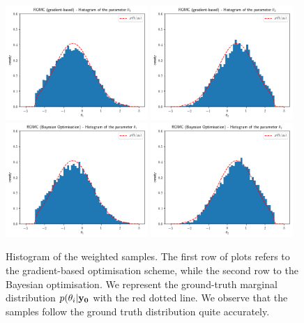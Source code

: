 \begin{figure}[h]
    \begin{center}
      \includegraphics[width=0.48\textwidth]{./Thesis/images/chapter4/ex2D_hist_t1_romc.png}
      \includegraphics[width=0.48\textwidth]{./Thesis/images/chapter4/ex2D_hist_t2_romc.png}\\
      \includegraphics[width=0.48\textwidth]{./Thesis/images/chapter4/ex2D_hist_t1_romc_bo.png}
      \includegraphics[width=0.48\textwidth]{./Thesis/images/chapter4/ex2D_hist_t2_romc_bo.png}\\
    \end{center}
    \caption{Histogram of the weighted samples. The first row of plots
      refers to the gradient-based optimisation scheme, while the
      second row to the Bayesian optimisation. We represent the
      ground-truth marginal distribution $p(\theta_i|\mathbf{y_0}$ with the
      red dotted line. We observe that the samples follow the ground
      truth distribution quite accurately.}
  \label{fig:ex2_3}
\end{figure}

